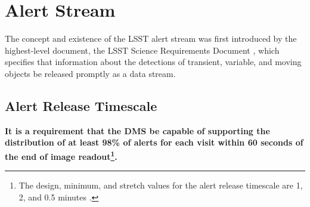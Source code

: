 \documentclass[DM,authoryear,toc]{lsstdoc}
\begin{document}


\section{Alert Stream} \label{sec:alerts}

The concept and existence of the \gls{LSST} alert stream was first introduced by the highest-level document, the \gls{LSST} Science Requirements \gls{Document} , which specifies that information about the detections of \gls{transient}, variable, and moving objects be released promptly as a data stream. 

	
\subsection{Alert \gls{Release} Timescale}\label{ssec:OTT1}

{\bf It is a requirement that the \gls{DMS} be capable of supporting the distribution of at least 98\% of alerts for each visit within 60 seconds of the end of image readout\footnote{The design, minimum, and stretch values for the alert release timescale are 1, 2, and 0.5 minutes .}.}
\end{document}
